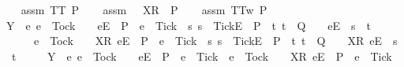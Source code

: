 \begin{isabellebody}
\ \ \isamarkupfalse%
\ assm{}{\isacharcolon}\ {\isachardoublequoteopen}TT\ P{\isachardoublequoteclose}\isanewline
\ \ \isamarkupfalse%
\ assm{}{\isacharcolon}\ {\isachardoublequoteopen}{\isasymrho}\ {\isacharat}\ {\isacharbrackleft}{\isacharbrackleft}X{\isacharbrackright}\isactrlsub R{\isacharbrackright}\ {\isasymin}\ P{\isachardoublequoteclose}\isanewline
\ \ \isamarkupfalse%
\ assm{}{\isacharcolon}\ {\isachardoublequoteopen}TT{}w\ P{\isachardoublequoteclose}\isanewline
\ \ \isamarkupfalse%
\ {\isachardoublequoteopen}Y\ {\isasyminter}\ {\isacharbraceleft}e{\isachardot}\ e\ {\isasymnoteq}\ Tock\ {\isasymand}\ {\isacharparenleft}{\isasymrho}\ {\isacharat}\ {\isacharbrackleft}{\isacharbrackleft}e{\isacharbrackright}\isactrlsub E{\isacharbrackright}\ {\isasymin}\ P\ {\isasymand}\ e\ {\isasymnoteq}\ Tick\ {\isasymor}\ {\isacharparenleft}{\isasymexists}s{\isachardot}\ s\ {\isacharat}\ {\isacharbrackleft}{\isacharbrackleft}Tick{\isacharbrackright}\isactrlsub E{\isacharbrackright}\ {\isasymin}\ P\ {\isasymand}\ {\isacharparenleft}{\isasymexists}t{\isachardot}\ t\ {\isasymin}\ Q\ {\isasymand}\ {\isasymrho}\ {\isacharat}\ {\isacharbrackleft}{\isacharbrackleft}e{\isacharbrackright}\isactrlsub E{\isacharbrackright}\ {\isacharequal}\ s\ {\isacharat}\ t{\isacharparenright}{\isacharparenright}{\isacharparenright}\ {\isasymor}\isanewline
\ \ \ \ \ \ e\ {\isacharequal}\ Tock\ {\isasymand}\ {\isacharparenleft}{\isasymrho}\ {\isacharat}\ {\isacharbrackleft}{\isacharbrackleft}X{\isacharbrackright}\isactrlsub R{\isacharcomma}\ {\isacharbrackleft}e{\isacharbrackright}\isactrlsub E{\isacharbrackright}\ {\isasymin}\ P\ {\isasymand}\ e\ {\isasymnoteq}\ Tick\ {\isasymor}\ {\isacharparenleft}{\isasymexists}s{\isachardot}\ s\ {\isacharat}\ {\isacharbrackleft}{\isacharbrackleft}Tick{\isacharbrackright}\isactrlsub E{\isacharbrackright}\ {\isasymin}\ P\ {\isasymand}\ {\isacharparenleft}{\isasymexists}t{\isachardot}\ t\ {\isasymin}\ Q\ {\isasymand}\ {\isasymrho}\ {\isacharat}\ {\isacharbrackleft}{\isacharbrackleft}X{\isacharbrackright}\isactrlsub R{\isacharcomma}\ {\isacharbrackleft}e{\isacharbrackright}\isactrlsub E{\isacharbrackright}\ {\isacharequal}\ s\ {\isacharat}\ t{\isacharparenright}{\isacharparenright}{\isacharparenright}{\isacharbraceright}\isanewline
\ \ \ \ {\isacharequal}\ Y\ {\isasyminter}\ {\isacharparenleft}{\isacharbraceleft}e{\isachardot}\ e\ {\isasymnoteq}\ Tock\ {\isasymand}\ {\isasymrho}\ {\isacharat}\ {\isacharbrackleft}{\isacharbrackleft}e{\isacharbrackright}\isactrlsub E{\isacharbrackright}\ {\isasymin}\ P\ {\isasymand}\ e\ {\isasymnoteq}\ Tick\ {\isasymor}\ e\ {\isacharequal}\ Tock\ {\isasymand}\ {\isasymrho}\ {\isacharat}\ {\isacharbrackleft}{\isacharbrackleft}X{\isacharbrackright}\isactrlsub R{\isacharcomma}\ {\isacharbrackleft}e{\isacharbrackright}\isactrlsub E{\isacharbrackright}\ {\isasymin}\ P\ {\isasymand}\ e\ {\isasymnoteq}\ Tick{\isacharbraceright}\isanewline

\end{isabellebody}
